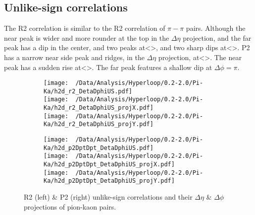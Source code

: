 \documentclass[12pt,a4paper,twoside]{report}
\begin{document}
\subsection{Unlike-sign correlations}
The R2 correlation is similar to the R2 correlation of $\pi-\pi$ pairs. Although the near peak is wider and more rounder at the top in the $\Delta\eta$ projection, and the far peak has a dip in the center, and two peaks at<>, and two sharp dips at<>. P2 has a narrow near side peak and ridges, in the $\Delta\eta$ projection, at<>. The near peak has a sudden rise at<>. The far peak features a shallow dip at $\Delta\phi=\pi$.
\begin{figure}[H]
	\begin{subfigure}{0.49\linewidth}
		\texttt{[image: ~/Data/Analysis/Hyperloop/0.2-2.0/Pi-Ka/h2d\_r2\_DetaDphiUS.pdf]}\\
		\texttt{[image: ~/Data/Analysis/Hyperloop/0.2-2.0/Pi-Ka/h2d\_r2\_DetaDphiUS\_projX.pdf]}\\
		\texttt{[image: ~/Data/Analysis/Hyperloop/0.2-2.0/Pi-Ka/h2d\_r2\_DetaDphiUS\_projY.pdf]}\\
	\end{subfigure}
	\begin{subfigure}{0.49\linewidth}
		\texttt{[image: ~/Data/Analysis/Hyperloop/0.2-2.0/Pi-Ka/h2d\_p2DptDpt\_DetaDphiUS.pdf]}\\
		\texttt{[image: ~/Data/Analysis/Hyperloop/0.2-2.0/Pi-Ka/h2d\_p2DptDpt\_DetaDphiUS\_projX.pdf]}\\
		\texttt{[image: ~/Data/Analysis/Hyperloop/0.2-2.0/Pi-Ka/h2d\_p2DptDpt\_DetaDphiUS\_projY.pdf]}\\
	\end{subfigure}
	\caption{R2 (left) \& P2 (right) unlike-sign correlations and their $\Delta\eta$ \& $\Delta\phi$ projections of pion-kaon pairs.}
\end{figure}
\end{document}
